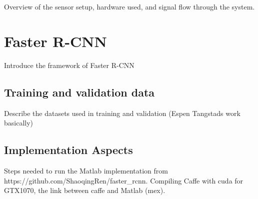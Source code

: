 Overview of the sensor setup, hardware used, and signal flow through the system.
\section{Faster R-CNN}
Introduce the framework of Faster R-CNN
\subsection{Training and validation data}
Describe the datasets used in training and validation (Espen Tangstads work basically)
\subsection{Implementation Aspects}
Steps needed to run the Matlab implementation from https://github.com/ShaoqingRen/faster\_rcnn. Compiling Caffe with cuda for GTX1070, the link between caffe and Matlab (mex).
